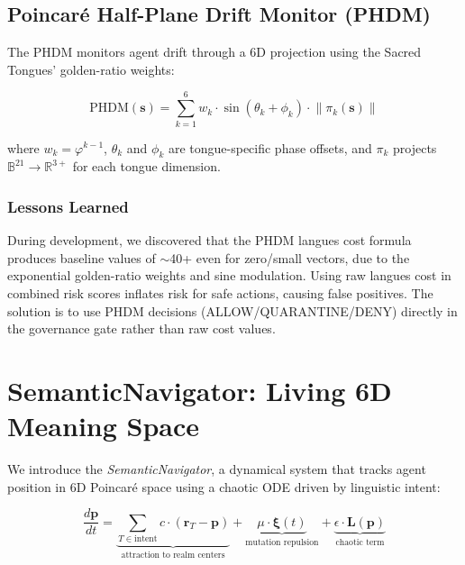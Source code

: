 \documentclass[11pt,a4paper]{article}
\newcommand{\BB}{\mathbb{B}}
\newcommand{\RR}{\mathbb{R}}
\newcommand{\norm}[1]{\left\|#1\right\|}
\newcommand{\golden}{\varphi}
\begin{document}
\subsection{Poincar\'{e} Half-Plane Drift Monitor (PHDM)}

The PHDM monitors agent drift through a 6D projection using the
Sacred Tongues' golden-ratio weights:

\begin{equation}
  \text{PHDM}(\mathbf{s}) = \sum_{k=1}^{6} w_k \cdot \sin(\theta_k + \phi_k)
  \cdot \norm{\pi_k(\mathbf{s})}
\end{equation}

where $w_k = \golden^{k-1}$, $\theta_k$ and $\phi_k$ are tongue-specific
phase offsets, and $\pi_k$ projects $\BB^{21} \to \RR^{3+}$ for each
tongue dimension.

\subsubsection{Lessons Learned}
\label{sec:phdm-lessons}

During development, we discovered that the PHDM langues cost formula
produces baseline values of $\sim$40+ even for zero/small vectors,
due to the exponential golden-ratio weights and sine modulation.
Using raw langues cost in combined risk scores inflates risk for safe
actions, causing false positives. The solution is to use PHDM decisions
(ALLOW/QUARANTINE/DENY) directly in the governance gate rather than
raw cost values.

\section{SemanticNavigator: Living 6D Meaning Space}
\label{sec:semantic-nav}

We introduce the \emph{SemanticNavigator}, a dynamical system that
tracks agent position in 6D Poincar\'{e} space using a chaotic ODE
driven by linguistic intent:

\begin{equation}
  \frac{d\mathbf{p}}{dt} = \underbrace{\sum_{T \in \text{intent}} c \cdot (\mathbf{r}_T - \mathbf{p})}_{\text{attraction to realm centers}}
  + \underbrace{\mu \cdot \boldsymbol{\xi}(t)}_{\text{mutation repulsion}}
  + \underbrace{\epsilon \cdot \mathbf{L}(\mathbf{p})}_{\text{chaotic term}}
\end{equation}
\end{document}
